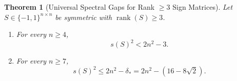 \documentclass[11pt,reqno]{article}
\newtheorem{theorem}{Theorem}[section]
\theoremstyle{definition}
\newcommand{\rank}{\operatorname{rank}}
\begin{document}
\begin{theorem}[Universal Spectral Gaps for Rank $\ge 3$ Sign Matrices]\label{thm:rank3-gap}
Let $S \in \{-1, 1\}^{n \times n}$ be symmetric with $\rank(S) \ge 3$.
\begin{enumerate}
    \item For every $n \ge 4$,
    \begin{equation}\label{eq:rank3-gap-4}
    s(S)^2 < 2n^2 - 3.
    \end{equation}
    \item For every $n \ge 7$,
    \begin{equation}\label{eq:rank3-gap-7}
    s(S)^2 \le 2n^2 - \delta_* = 2n^2 - (16 - 8\sqrt{2}).
    \end{equation}
\end{enumerate}
\end{theorem}
\end{document}
